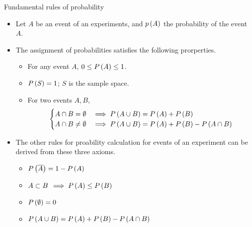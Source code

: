 \documentclass[aspectratio=169]{beamer}
\let\olditem\item
\renewcommand{\item}{\setlength{\itemsep}{\fill}\olditem}
\def\lp{\ensuremath\left(}
\def\rp{\ensuremath\right)}
\newcommand{\ct}[1]{\lp #1\rp}
\begin{document}
\begin{frame}[t]{Fundamental rules of probability}
\begin{itemize}
  \item Let $A$ be an event of an experiments, and $p\ct{A}$ the probability of the event $A$.
  
  \item The assignment of probabilities satisfies the following prorperties.
  \begin{itemize}
    \item For any event $A$, $0 \leq P\lp A \rp \leq 1$.
    \item $P\lp S \rp = 1$; $S$ is the sample space.
    \item For two events $A, B$, 
    \[ \begin{cases}
      A \cap B = \emptyset & \implies P\lp A \cup B\rp = P\lp A\rp + P\lp B\rp\\
      A \cap B \neq \emptyset & \implies P\lp A \cup B\rp = P\lp A\rp + P\lp B\rp - P\lp A \cap B\rp
       \end{cases} \]
  \end{itemize}

  \item  The other rules for proability calculation for events of an experiment can be derived from these three axioms.
  \begin{itemize}
    \item $P\lp \overline{A}\rp = 1 - P\lp A \rp$
    \item $A \subset B \, \implies P\lp A \rp \leq P\lp B\rp$
    \item $P\lp \emptyset \rp = 0$
    \item $P\lp A \cup B \rp = P\lp A\rp + P\lp B\rp - P\lp A \cap B\rp$
  \end{itemize}
\end{itemize}
\end{frame}
\end{document}
